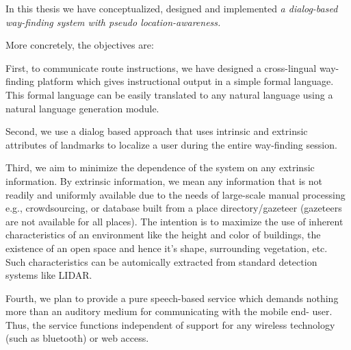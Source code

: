 \documentclass{iitkthesis}
\begin{document}
In this thesis we have conceptualized, designed and implemented
{
\textit{a dialog-based way-finding system with pseudo location-awareness.}
}

More concretely, the objectives are:

First, to communicate route instructions, we have designed a cross-lingual way-finding platform which gives instructional output in a simple
formal language. This formal language can be easily translated to
any natural language using a natural language generation module.

Second, we use a dialog based approach that uses intrinsic and extrinsic attributes of 
landmarks to localize a user during the entire way-finding session.

Third, we aim to minimize the dependence of the system on any extrinsic 
information. By extrinsic information, we mean any information that is 
not readily and uniformly available due to the needs of large-scale 
manual processing e.g., crowdsourcing, or database built from a place 
directory/gazeteer (gazeteers are not available for all places). The 
intention is to maximize the use of inherent characteristics of an 
environment like the height and color of buildings, the existence of an 
open space and hence it's shape, surrounding vegetation, etc. Such 
characteristics can be automically extracted from standard detection 
systems like LIDAR.

Fourth, we plan to provide a pure speech-based service which demands 
nothing more than an auditory medium for communicating with the mobile end-
user. Thus, the service functions independent of 
support for any wireless technology (such as bluetooth) or web access.
\end{document}
